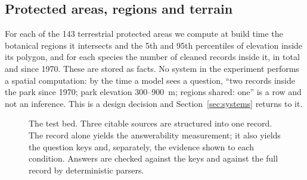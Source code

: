 \documentclass[11pt,a4paper]{article}
\begin{document}
\subsection{Protected areas, regions and terrain}
For each of the 143 terrestrial protected areas we compute at build time the
botanical regions it intersects and the 5th and 95th percentiles of elevation inside
its polygon, and for each species the number of cleaned records inside it, in total
and since 1970. These are stored as facts. No system in the experiment performs a
spatial computation: by the time a model sees a question, ``two records inside the
park since 1970; park elevation 300--900~m; regions shared: one'' is a row and not an
inference. This is a design decision and Section~\ref{sec:systems} returns to it.

\begin{figure}[htbp]
\centering
{}
\caption{The test bed. Three citable sources are structured into one record. The
record alone yields the answerability measurement; it also yields the question keys
and, separately, the evidence shown to each condition. Answers are checked against
the keys and against the full record by deterministic parsers.}
\label{fig:pipeline}
\end{figure}
\end{document}

